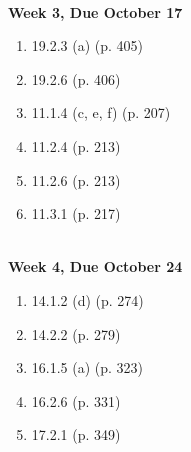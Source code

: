 \documentclass[12pt, twocolumn]{article}
\begin{document}
\begin{minipage}[t]{0.5\textwidth}

\ \\ \textbf{Week 3, Due October 17} 
\begin{enumerate} 
\item 19.2.3 (a) (p. 405)
\item 19.2.6 (p. 406)
\item 11.1.4 (c, e, f) (p. 207)
\item 11.2.4 (p. 213)
\item 11.2.6 (p. 213)
\item 11.3.1 (p. 217)
\end{enumerate}

\ \\\textbf{Week 4, Due October 24} 

\begin{enumerate} 
\item 14.1.2 (d) (p. 274)
\item 14.2.2 (p. 279)
\item 16.1.5 (a) (p. 323)
\item 16.2.6 (p. 331)
\item 17.2.1 (p. 349)

\end{enumerate}

\end{minipage}
\end{document}
